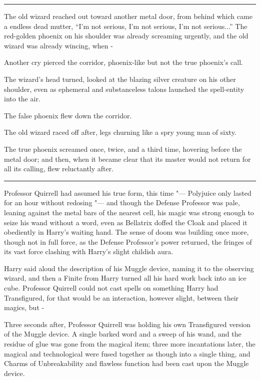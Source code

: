 \begin{center}\rule{3in}{0.4pt}\end{center}

The old wizard reached out toward another metal door, from behind which
came a endless dead mutter, ``I'm not serious, I'm not serious, I'm not
serious...'' The red-golden phoenix on his shoulder was already
screaming urgently, and the old wizard was already wincing, when -

Another cry pierced the corridor, phoenix-like but not the true
phoenix's call.

The wizard's head turned, looked at the blazing silver creature on his
other shoulder, even as ephemeral and substanceless talons launched the
spell-entity into the air.

The false phoenix flew down the corridor.

The old wizard raced off after, legs churning like a spry young man of
sixty.

The true phoenix screamed once, twice, and a third time, hovering before
the metal door; and then, when it became clear that its master would not
return for all its calling, flew reluctantly after.

\begin{center}\rule{3in}{0.4pt}\end{center}

Professor Quirrell had assumed his true form, this time "--- Polyjuice only
lasted for an hour without redosing "--- and though the Defense Professor
was pale, leaning against the metal bars of the nearest cell, his magic
was strong enough to seize his wand without a word, even as Bellatrix
doffed the Cloak and placed it obediently in Harry's waiting hand. The
sense of doom was building once more, though not in full force, as the
Defense Professor's power returned, the fringes of its vast force
clashing with Harry's slight childish aura.

Harry said aloud the description of his Muggle device, naming it to the
observing wizard, and then a Finite from Harry turned all his hard work
back into an ice cube. Professor Quirrell could not cast spells on
something Harry had Transfigured, for that would be an interaction,
however slight, between their magics, but -

Three seconds after, Professor Quirrell was holding his own Transfigured
version of the Muggle device. A single barked word and a sweep of his
wand, and the residue of glue was gone from the magical item; three more
incantations later, the magical and technological were fused together as
though into a single thing, and Charms of Unbreakability and flawless
function had been cast upon the Muggle device.

